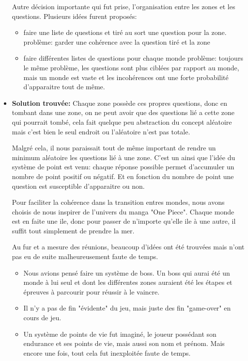 \begin{itemize}
Autre décision importante qui fut prise, l'organisation entre les zones et les questions.
Plusieurs idées furent proposés: 
\begin{itemize}
\item faire une liste de questions et tiré au sort une question pour la zone.
   problème: garder une cohérence avec la question tiré et la zone
\item faire différentes listes de questions pour chaque monde
   problème: toujours le même problème, les questions sont plus ciblées par rapport au monde, mais un       		   monde est vaste et les incohérences ont une forte probabilité d'apparaitre tout de même.
   
\end{itemize}
 
 
\item \textbf{Solution trouvée:} Chaque zone possède ces propres questions, donc en tombant dans une zone, on ne peut avoir que des questions lié a cette zone qui pourrait tombé, cela fait quelque peu abstraction du concept aléatoire mais c'est bien le seul endroit ou l'aléatoire n'est pas totale.
\newline

Malgré cela, il nous paraissait tout de même important de rendre un minimum aléatoire les questions lié à une zone. C'est un ainsi que l'idée du système de point est venu: chaque réponse possible permet d'accumuler un nombre de point positif ou négatif. Et en fonction du nombre de point une question est susceptible d'apparaitre ou non.
\newline

Pour faciliter la cohérence dans la transition entres mondes, nous avons choisis de nous inspirer de l'univers du manga "One Piece". Chaque monde est en faite une ile, donc pour passer de n'importe qu'elle ile à une autre, il suffit tout simplement de prendre la mer.
\newline

Au fur et a mesure des réunions, beaucoup d'idées ont été trouvées mais n'ont pas eu de suite malheureusement faute de temps.
\newline

\begin{itemize}
\item Nous avions pensé faire un système de boss. Un boss qui aurai été un monde à lui seul et dont les différentes zones auraient été les étapes et épreuves à parcourir pour réussir à le vaincre.
  \newline
\item Il n'y a pas de fin "évidente" du jeu, mais juste des fin "game-over" en cours de jeu.
  \newline
\item Un système de points de vie fut imaginé, le joueur possédant son endurance et ses points de vie, mais aussi son nom et prénom. Mais encore une fois, tout cela fut inexploitée faute de temps.
  \newline
\end{itemize}
\end{itemize}